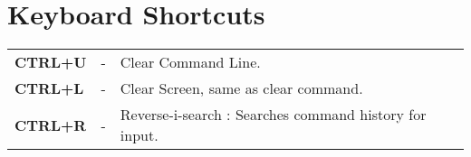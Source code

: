 \chapter{Keyboard Shortcuts}
	\begin{tabular}{lcl}
		\textbf{CTRL+U} &- &Clear Command Line. \\
		\textbf{CTRL+L} &- &Clear Screen, same as clear command. \\
		\textbf{CTRL+R} &- &Reverse-i-search : Searches command history for input.
	\end{tabular}
